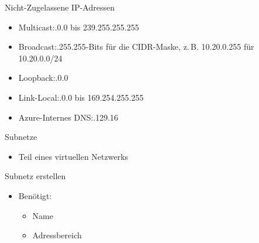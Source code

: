 \begin{flashcard}[Definition]{Nicht-Zugelassene IP-Adressen}
    \begin{itemize}
        \item Multicast:.0.0 bis 239.255.255.255
        \item Broadcast:.255.255-Bits für die CIDR-Maske, z.\,B. 10.20.0.255 für 10.20.0.0/24
        \item Loopback:.0.0
        \item Link-Local:.0.0 bis 169.254.255.255
        \item Azure-Internes DNS:.129.16
    \end{itemize}
\end{flashcard}


\begin{flashcard}[Definition]{Subnetze}
    \begin{itemize}
        \item Teil eines virtuellen Netzwerks
    \end{itemize}
\end{flashcard}

\begin{flashcard}[Definition]{Subnetz erstellen}
    \begin{itemize}
        \item Benötigt:
        \begin{itemize}
            \item Name
            \item Adressbereich
        \end{itemize}
    \end{itemize}
\end{flashcard}

